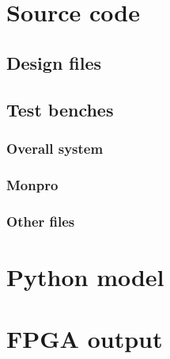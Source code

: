 \appendix
\section{Source code}
\subsection{Design files}

\subsection{Test benches}
\label{app:test_bench}
\subsubsection{Overall system}
\label{app:rsa_tb}
\subsubsection{Monpro}
\label{app:monpro_tb}
\subsubsection{Other files}
\label{app:others}

\section{Python model}
\label{app:python}

\section{FPGA output}
